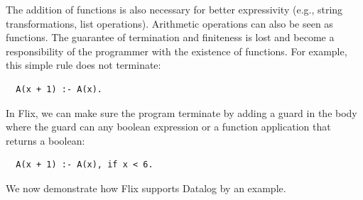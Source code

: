 \documentclass[11pt]{report}
\theoremstyle{definition}
\begin{document}
The addition of functions is also necessary for better expressivity (e.g., string transformations, list operations). Arithmetic operations can also be seen as functions. The guarantee of termination and finiteness is lost and become a responsibility of the programmer with the existence of functions. For example, this simple rule does not terminate:
\begin{verbatim}
  A(x + 1) :- A(x).
\end{verbatim}

In Flix, we can make sure the program terminate by adding a guard in the body where the guard can any boolean expression or a function application that returns a boolean:
\begin{verbatim}
  A(x + 1) :- A(x), if x < 6.
\end{verbatim}

We now demonstrate how Flix supports Datalog by an example.
\end{document}
